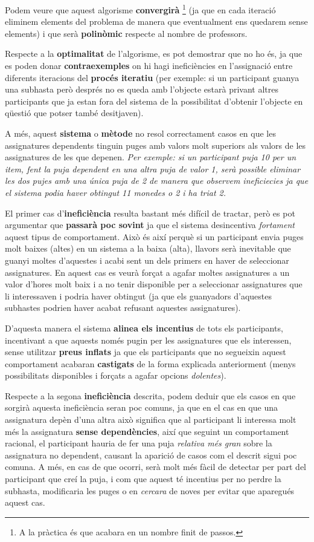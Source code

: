 \documentclass[10pt,twocolumn]{article}
\begin{document}
Podem veure que aquest algorisme \textbf{convergirà} \footnote{A la pràctica és que acabara en un nombre finit de passos.} (ja que en cada iteració eliminem elements del problema de manera que eventualment ens quedarem sense elements) i que serà \textbf{polinòmic} respecte al nombre de professors.

Respecte a la \textbf{optimalitat} de l'algorisme, es pot demostrar que no ho és, ja que es poden donar \textbf{contraexemples} on hi hagi ineficiències en l'assignació entre diferents iteracions del \textbf{procés iteratiu} (per exemple: si un participant guanya una subhasta però després no es queda amb l'objecte estarà privant altres participants que ja estan fora del sistema de la possibilitat d'obtenir l'objecte en qüestió que potser també desitjaven). 

A més, aquest \textbf{sistema} o \textbf{mètode} no resol correctament casos en que les assignatures dependents tinguin puges amb valors molt superiors als valors de les assignatures de les que depenen.
\textit{Per exemple: si un participant puja 10 per un item, fent la puja dependent en una altra puja de valor 1, serà possible eliminar les dos pujes amb una única puja de 2 de manera que observem ineficiecies ja que el sistema podia haver obtingut 11 monedes o 2 i ha triat 2.}

El primer cas d'\textbf{ineficiència} resulta bastant més difícil de tractar, però es pot argumentar que \textbf{passarà poc sovint} ja que el sistema desincentiva \textit{fortament} aquest tipus de comportament. Això és així perquè si un participant envia puges molt baixes (altes) en un sistema a la baixa (alta), llavors serà inevitable que guanyi moltes d'aquestes i acabi sent un dels primers en haver de seleccionar assignatures. En aquest cas es veurà forçat a agafar moltes assignatures a un valor d'hores molt baix i a no tenir disponible per a seleccionar assignatures que li interessaven i podria haver obtingut (ja que els guanyadors d'aquestes subhastes podrien haver acabat refusant aquestes assignatures). 

D'aquesta manera el sistema \textbf{alinea els incentius} de tots els participants, incentivant a que aquests només pugin per les assignatures que els interessen, sense utilitzar \textbf{preus inflats} ja que els participants que no segueixin aquest comportament acabaran \textbf{castigats} de la forma explicada anteriorment (menys possibilitats disponibles i forçats a agafar opcions \textit{ dolentes}).

Respecte a la segona \textbf{ineficiència} descrita, podem deduir que els casos en que sorgirà aquesta ineficiència seran poc comuns, ja que en el cas en que una assignatura depèn d'una altra això significa que al participant li interessa molt més la assignatura \textbf{sense dependències}, així que seguint un comportament racional, el participant hauria de fer una puja \textit{relativa més gran} sobre la assignatura no dependent, causant  la aparició de casos com el descrit sigui poc comuna. A més, en cas de que ocorri, serà molt més fàcil de detectar per part del participant que creí la puja, i com que aquest té incentius per no perdre la subhasta, modificaria les puges o en \textit{cercara} de noves per evitar que aparegués aquest cas.
\end{document}
